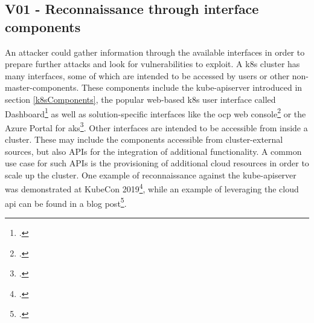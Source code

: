 

\subsection{V01 - Reconnaissance through interface components} \label{v01}
An attacker could gather information through the available interfaces in order to prepare further attacks and look for vulnerabilities to exploit.
A \gls{k8s} cluster has many interfaces, some of which are intended to be accessed by users or other non-master-components. These components include the kube-apiserver introduced in section \ref{k8sComponents}, the popular web-based \gls{k8s} user interface called Dashboard\footcite[][, first paragraph]{k8sDashboard} as well as solution-specific interfaces like the \gls{ocp} web console\footcite[][, section 'Overview']{ocpWebConsole} or the Azure Portal for \gls{aks}\footcite[][, section 'Create an AKS cluster']{azurePortal}.
Other interfaces are intended to be accessible from inside a cluster. These may include the components accessible from cluster-external sources, but also APIs for the integration of additional functionality. A common use case for such APIs is the provisioning of additional cloud resources in order to scale up the cluster.
One example of reconnaissance against the kube-apiserver was demonstrated at KubeCon 2019\footcite[][, starting at 8:45]{lizReconDemo}, while an example of leveraging the cloud api can be found in a blog post\footcite{aksApiExploit}.


